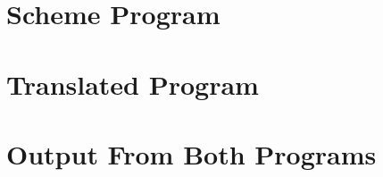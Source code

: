 \label{sec:transexample}
\section{Scheme Program}

\section{Translated Program}

\section{Output From Both Programs}
